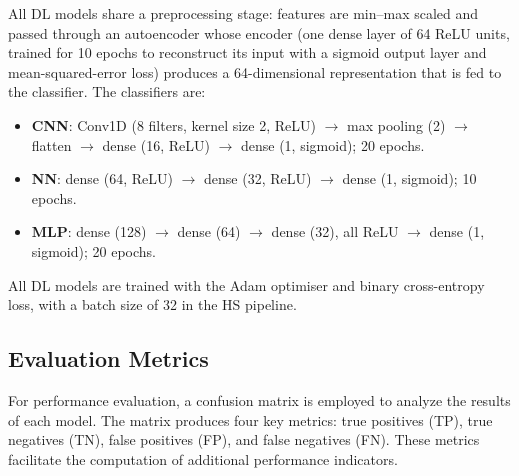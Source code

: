\documentclass[11pt,a4paper]{article}
\begin{document}
All DL models share a preprocessing stage: features are min--max scaled and
passed through an autoencoder whose encoder (one dense layer of 64 ReLU
units, trained for 10 epochs to reconstruct its input with a sigmoid output
layer and mean-squared-error loss) produces a 64-dimensional representation
that is fed to the classifier. The classifiers are:
\begin{itemize}
  \item \textbf{CNN}: Conv1D (8 filters, kernel size 2, ReLU) $\rightarrow$
    max pooling (2) $\rightarrow$ flatten $\rightarrow$ dense (16, ReLU)
    $\rightarrow$ dense (1, sigmoid); 20 epochs.
  \item \textbf{NN}: dense (64, ReLU) $\rightarrow$ dense (32, ReLU)
    $\rightarrow$ dense (1, sigmoid); 10 epochs.
  \item \textbf{MLP}: dense (128) $\rightarrow$ dense (64) $\rightarrow$
    dense (32), all ReLU $\rightarrow$ dense (1, sigmoid); 20 epochs.
\end{itemize}
All DL models are trained with the Adam optimiser and binary cross-entropy
loss, with a batch size of 32 in the HS pipeline.

\subsection{Evaluation Metrics}

For performance evaluation, a confusion matrix is employed to analyze the
results of each model. The matrix produces four key metrics: true positives
(TP), true negatives (TN), false positives (FP), and false negatives (FN).
These metrics facilitate the computation of additional performance
indicators.
\end{document}
